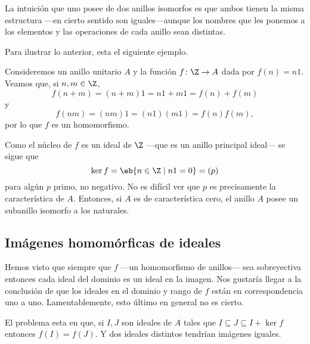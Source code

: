 La intuición que uno posee de dos anillos isomorfos es que ambos tienen la misma estructura ---en cierto sentido son igua\-les---aunque los nombres que les ponemos a los elementos y las operaciones de cada anillo sean distintas.

Para ilustrar lo anterior, esta el siguiente ejemplo.


\begin{ejem}
	Consideremos un anillo unitario $A$ y la función $f\colon \Z\to A$ dada por $f(n) = n1$. Veamos que, si $n,m\in \Z$,
	\[ f(n+m) = (n+m)1 = n1 + m1 = f(n) + f(m) \]
	y
	\[ f(nm) = (nm)1 = (n1)(m1) = f(n)f(m), \]
	por lo que $f$ es un homomorfismo.
	
	Como el núcleo de $f$ es un ideal de $\Z$ ---que es un anillo principal ideal--- se sigue que
	\[ \ker f = \eb{n\in \Z \mid n1=0} = (p) \]
	para algún $p$ primo, no negativo. No es difícil ver que $p$ es precisamente la característica de $A$. Entonces, si $A$ es de característica cero, el anillo $A$ posee un subanillo isomorfo a los naturales.
\end{ejem}
\subsection{Imágenes homomórficas de ideales}
Hemos visto que siempre que $f$ ---un homomorfismo de ani\-llos--- sea sobreyectiva entonces cada ideal del dominio es un ideal en la imagen. Nos gustaría llegar a la conclusión de que los ideales en el dominio y rango de $f$ están en correspondencia uno a uno. Lamentablemente, esto último en general no es cierto.

El problema esta en que, si $I,J$ son ideales de $A$ tales que $I \subseteq J \subseteq I + \ker f$ entonces $f(I) = f(J)$. Y dos ideales distintos tendrían imágenes iguales. 

